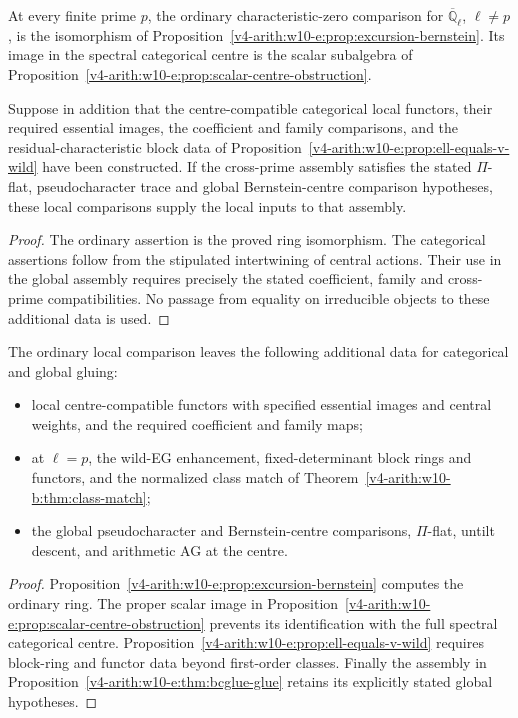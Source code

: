 \begin{theorem}
\label{v4-arith:w10-e:thm:combined-closure}
\ClaimStatusProvedHereConditional
At every finite prime \(p\), the ordinary
characteristic-zero comparison for
\(\overline{\mathbb Q}_{\ell}\), \(\ell\neq p\),
is the isomorphism of
Proposition~\ref{v4-arith:w10-e:prop:excursion-bernstein}.
Its image in the spectral categorical centre
is the scalar subalgebra of
Proposition~\ref{v4-arith:w10-e:prop:scalar-centre-obstruction}.

Suppose in addition that the centre-compatible
categorical local functors, their required
essential images, the coefficient and family
comparisons, and the residual-characteristic
block data of
Proposition~\ref{v4-arith:w10-e:prop:ell-equals-v-wild}
have been constructed. If the cross-prime
assembly satisfies the stated \(\Pi\)-flat,
pseudocharacter trace and global
Bernstein-centre comparison hypotheses, these
local comparisons supply the local inputs to
that assembly.
\end{theorem}

\begin{proof}
The ordinary assertion is the proved ring
isomorphism. The categorical assertions follow
from the stipulated intertwining of central
actions. Their use in the global assembly
requires precisely the stated coefficient,
family and cross-prime compatibilities.
No passage from equality on irreducible
objects to these additional data is used.
\end{proof}

\begin{corollary}
\label{v4-arith:w10-e:cor:domain-delta}
\ClaimStatusProvedHere The ordinary local comparison leaves the
following additional data for categorical and global gluing:
\begin{itemize}
\item local centre-compatible functors with specified essential images
and central weights, and the required coefficient and family maps;
\item at $\ell=p$, the wild-EG enhancement, fixed-determinant block
rings and functors, and the normalized class match of
Theorem~\ref{v4-arith:w10-b:thm:class-match};
\item the global pseudocharacter and Bernstein-centre comparisons,
$\Pi$-flat, untilt descent, and arithmetic AG at the centre.
\end{itemize}
\end{corollary}
\begin{proof}
Proposition~\ref{v4-arith:w10-e:prop:excursion-bernstein} computes the ordinary
ring. The proper scalar image in
Proposition~\ref{v4-arith:w10-e:prop:scalar-centre-obstruction} prevents its
identification with the full spectral categorical centre.
Proposition~\ref{v4-arith:w10-e:prop:ell-equals-v-wild} requires block-ring
and functor data beyond first-order classes. Finally the assembly
in Proposition~\ref{v4-arith:w10-e:thm:bcglue-glue} retains its explicitly
stated global hypotheses.
\end{proof}

